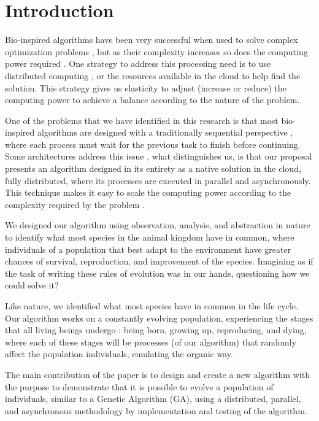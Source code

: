 \documentclass[runningheads]{llncs}
\begin{document}
\section{Introduction} 

Bio-inspired algorithms have been very successful when used to solve complex
optimization problems
\cite{castillo2019comparative,valdez2021swarm,acherjee2020ultrasonic}, but as
their complexity increases so does the computing power required
\cite{ontiveros2018high}. One strategy to address this processing need is to
use distributed computing \cite{thain2005distributed}, or the resources
available in the cloud \cite{garcia2013there,eshratifar2019bottlenet} to help
find the solution. This strategy gives us elasticity to adjust (increase or
reduce) the computing power to achieve a balance according to the nature of the
problem.

One of the problems that we have identified in this research is that most
bio-inspired algorithms are designed with a traditionally sequential
perspective \cite{porto2018evolutionary,back1996evolutionary}, where each
process must wait for the previous task to finish before continuing. Some
architectures address this issue
\cite{valdez2021container,garcia2015evospace,merelo2016nodio}, what
distinguishes us, is that our proposal presents an algorithm designed in its
entirety as a native solution in the cloud, fully distributed, where its
processes are executed in parallel and asynchronously. This technique makes it
easy to scale the computing power according to the complexity required by the
problem \cite{armbrust2010view}.

We designed our algorithm using observation, analysis, and abstraction in
nature to identify what most species in the animal kingdom have in common,
where individuals of a population that best adapt to the environment have
greater chances of survival, reproduction, and improvement of the species.
Imagining as if the task of writing these rules of evolution was in our hands,
questioning how we could solve it?

Like nature, we identified what most species have in common in the life cycle.
Our algorithm works on a constantly evolving population, experiencing the
stages that all living beings undergo \cite{read1968system}: being born,
growing up, reproducing, and dying, where each of these stages will be
processes (of our algorithm) that randomly affect the population individuals,
emulating the organic way.

The main contribution of the paper is to design and create a new algorithm with
the purpose to demonstrate that it is possible to evolve a population of
individuals, similar to a Genetic Algorithm (GA), using a distributed,
parallel, and asynchronous methodology by implementation and testing of the
algorithm. 
\end{document}
